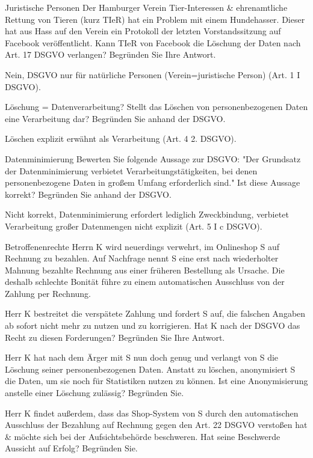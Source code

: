 \documentclass{exercisesheet}
\begin{document}
\begin{exercise}{Juristische Personen}
  Der Hamburger Verein Tier-Interessen \& ehrenamtliche Rettung von Tieren (kurz TIeR) hat ein Problem mit einem Hundehasser. Dieser hat aus Hass auf den Verein ein Protokoll der letzten Vorstandssitzung auf Facebook veröffentlicht. Kann TIeR von Facebook die Löschung der Daten nach Art. 17 DSGVO verlangen? Begründen Sie Ihre Antwort.

  \begin{solution}
    Nein, DSGVO nur für natürliche Personen (Verein=juristische Person) (Art. 1 I DSGVO).
  \end{solution}
\end{exercise}

\begin{exercise}{Löschung = Datenverarbeitung?}
  Stellt das Löschen von personenbezogenen Daten eine Verarbeitung dar? Begründen Sie anhand der DSGVO.

  \begin{solution}
    Löschen explizit erwähnt als Verarbeitung (Art. 4 2. DSGVO).
  \end{solution}
\end{exercise}

\begin{exercise}{Datenminimierung}
  Bewerten Sie folgende Aussage zur DSGVO: "Der Grundsatz der Datenminimierung verbietet Verarbeitungstätigkeiten, bei denen personenbezogene Daten in großem Umfang erforderlich sind." Ist diese Aussage korrekt? Begründen Sie anhand der DSGVO.

  \begin{solution}
    Nicht korrekt, Datenminimierung erfordert lediglich Zweckbindung, verbietet Verarbeitung großer Datenmengen nicht explizit (Art. 5 I c DSGVO).
  \end{solution}
\end{exercise}

\begin{eexercises}{Betroffenenrechte}{
    Herrn K wird neuerdings verwehrt, im Onlineshop S auf Rechnung zu bezahlen. Auf Nachfrage nennt S eine erst nach wiederholter Mahnung bezahlte Rechnung aus einer früheren Bestellung als Ursache. Die deshalb schlechte Bonität führe zu einem automatischen Ausschluss von der Zahlung per Rechnung.
  }
  \item Herr K bestreitet die verspätete Zahlung und fordert S auf, die falschen Angaben ab sofort nicht mehr zu nutzen und zu korrigieren. Hat K nach der DSGVO das Recht zu diesen Forderungen? Begründen Sie Ihre Antwort.
  \item Herr K hat nach dem Ärger mit S nun doch genug und verlangt von S die Löschung seiner personenbezogenen Daten. Anstatt zu löschen, anonymisiert S die Daten, um sie noch für Statistiken nutzen zu können. Ist eine Anonymisierung anstelle einer Löschung zulässig? Begründen Sie.
  \item Herr K findet außerdem, dass das Shop-System von S durch den automatischen Ausschluss der Bezahlung auf Rechnung gegen den Art. 22 DSGVO verstoßen hat \& möchte sich bei der Aufsichtsbehörde beschweren. Hat seine Beschwerde Aussicht auf Erfolg? Begründen Sie.
\end{eexercises}
\end{document}
